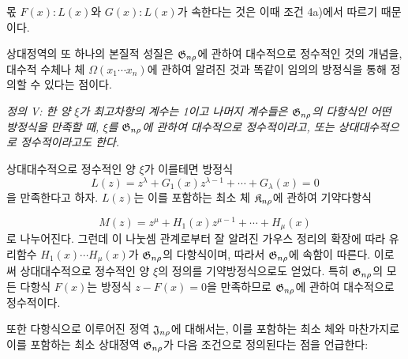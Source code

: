 몫 $F(x):L(x)$와 $G(x):L(x)$가 속한다는 것은 이때 조건 4a)에서 따르기 때문이다.

상대정역의 또 하나의 본질적 성질은 
\glqq{}$\mathfrak G_{n\rho}$에 관하여 대수적으로 정수적인 것\grqq{}의 개념을, 대수적 수체나 체 $\Omega(x_1\cdots x_n)$에 관하여 알려진 것과 똑같이 임의의 방정식을 통해 정의할 수 있다는 점이다.

\emph{정의 V: 한 양 $\xi$가 최고차항의 계수는 1이고 나머지 계수들은 $\mathfrak G_{n\rho}$의 다항식인 어떤 방정식을 만족할 때, $\xi$를 $\mathfrak G_{n\rho}$에 관하여 대수적으로 정수적이라고, 또는 상대대수적으로 정수적이라고도 한다.}

상대대수적으로 정수적인 양 $\xi$가 이를테면 방정식
\[
L(z)=z^\lambda+G_1(x)z^{\lambda-1}+\cdots+G_\lambda(x)=0
\]
을 만족한다고 하자. $L(z)$는 이를 포함하는 최소 체 $\mathfrak K_{n\rho}$에 관하여 기약다항식

\[
M(z)=z^\mu+H_1(x)z^{\mu-1}+\cdots+H_\mu(x)
\]
로 나누어진다. 그런데 이 나눗셈 관계로부터 잘 알려진 가우스 정리의 확장에 따라 유리함수 $H_1(x)\cdots H_\mu(x)$가 $\mathfrak G_{n\rho}$의 다항식이며, 따라서 $\mathfrak G_{n\rho}$에 속함이 따른다. 이로써 상대대수적으로 정수적인 양 $\xi$의 정의를 기약방정식으로도 얻었다. 특히 $\mathfrak G_{n\rho}$의 모든 다항식 $F(x)$는 방정식 $z-F(x)=0$을 만족하므로 $\mathfrak G_{n\rho}$에 관하여 대수적으로 정수적이다.

또한 다항식으로 이루어진 정역 $\mathfrak J_{n\rho}$에 대해서는, 이를 포함하는 최소 체와 마찬가지로 이를 포함하는 최소 상대정역 $\mathfrak G_{n\rho}$가 다음 조건으로 정의된다는 점을 언급한다:


